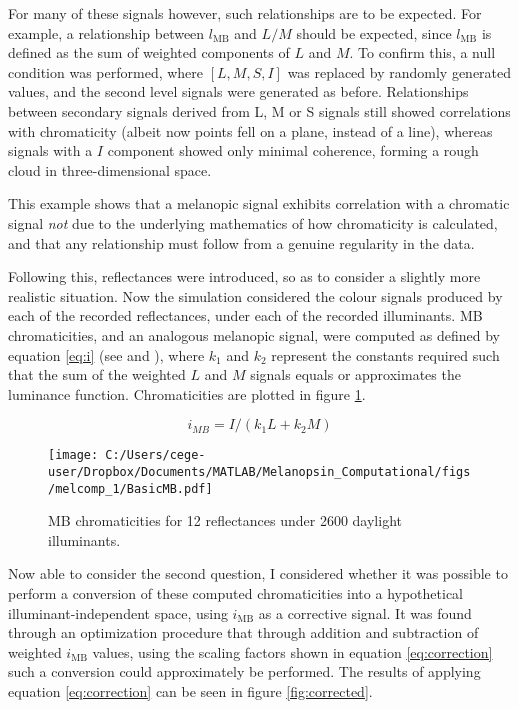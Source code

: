 For many of these signals however, such relationships are to be expected. For example, a relationship between $l_{\text{MB}}$ and $L/M$ should be expected, since $l_{\text{MB}}$ is defined as the sum of weighted components of $L$ and $M$. To confirm this, a null condition was performed, where $[L,M,S,I]$ was replaced by randomly generated values, and the second level signals were generated as before. Relationships between secondary signals derived from L, M or S signals still showed correlations with chromaticity (albeit now points fell on a plane, instead of a line), whereas signals with a $I$ component showed only minimal coherence, forming a rough cloud in three-dimensional space. 

This example shows that a melanopic signal exhibits correlation with a chromatic signal \emph{not} due to the underlying mathematics of how chromaticity is calculated, and that any relationship must follow from a genuine regularity in the data.

Following this, reflectances were introduced, so as to consider a slightly more realistic situation. Now the simulation considered the colour signals produced by each of the recorded reflectances, under each of the recorded illuminants. \ac{MB} chromaticities, and an analogous melanopic signal, were computed as defined by equation \ref{eq:i} (see \cite{macleod_chromaticity_1979} and \cite{cie_cie_2015}), where $k_1$ and $k_2$ represent the constants required such that the sum of the weighted $L$ and $M$ signals equals or approximates the luminance function. Chromaticities are plotted in figure \ref{fig:mb}.

\begin{equation} \label{eq:i}
i_{MB} = I/(k_1L + k_2M) 
\end{equation}

\begin{figure}[h]
    \centering
    \texttt{[image: C:/Users/cege-user/Dropbox/Documents/MATLAB/Melanopsin\_Computational/figs/melcomp\_1/BasicMB.pdf]}
    \caption{\ac{MB} chromaticities for 12 reflectances under 2600 daylight illuminants.}
    \label{fig:mb}
\end{figure} 

Now able to consider the second question, I considered whether it was possible to perform a conversion of these computed chromaticities into a hypothetical illuminant-independent space, using $i_{\text{MB}}$ as a corrective signal. It was found through an optimization procedure that through addition and subtraction of weighted $i_{\text{MB}}$ values, using the scaling factors shown in equation \ref{eq:correction} such a conversion could approximately be performed. The results of applying equation \ref{eq:correction} can be seen in figure \ref{fig:corrected}.

